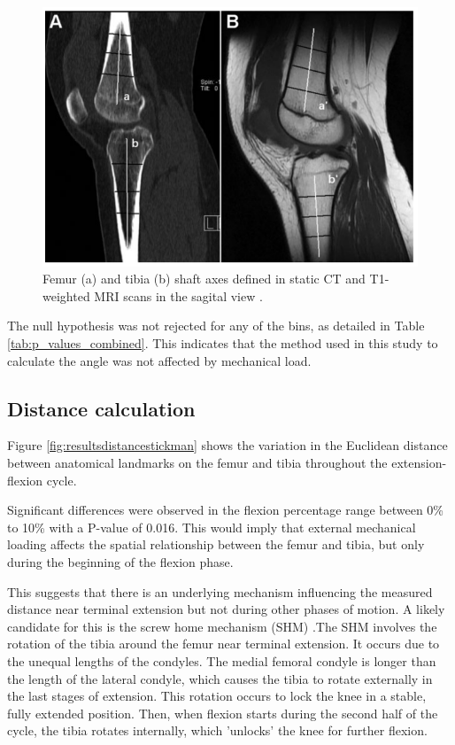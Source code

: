 \documentclass{micro-econ-thesis}
\begin{document}
\begin{figure}[H]
	\centering
	\includegraphics[width=0.7\linewidth]{dai_image}
	\caption{Femur (a) and tibia (b) shaft axes defined in static CT and T1-weighted MRI scans in the sagital view \parencite{dai_comparing_2021}. }
	\label{fig:daiimage}
\end{figure}

The null hypothesis was not rejected for any of the bins, as detailed in Table \ref{tab:p_values_combined}. This indicates that the method used in this study to calculate the angle was not affected by mechanical load.



\subsection{Distance calculation}

Figure \ref{fig:resultsdistancestickman} shows the variation in the Euclidean distance between anatomical landmarks on the femur and tibia throughout the extension-flexion cycle.

Significant differences were observed in the flexion percentage range between 0\% to 10\% with a P-value of 0.016. This would imply that external mechanical loading affects the spatial relationship between the femur and tibia, but only during the beginning of the flexion phase. 

This suggests that there is an underlying mechanism influencing the measured distance near terminal extension but not during other phases of motion. A likely candidate for this is the screw home mechanism (SHM) \parencite{kim_screw-home_2015}.The SHM involves the rotation of the tibia around the femur near terminal extension. It occurs due to the unequal lengths of the condyles. The medial femoral condyle is longer than the length of the lateral condyle, which causes the tibia to rotate externally in the last stages of extension.   This rotation occurs to lock the knee in a stable, fully extended position. Then, when flexion starts during the second half of the cycle, the tibia rotates internally, which 'unlocks' the knee for further flexion.
\end{document}
